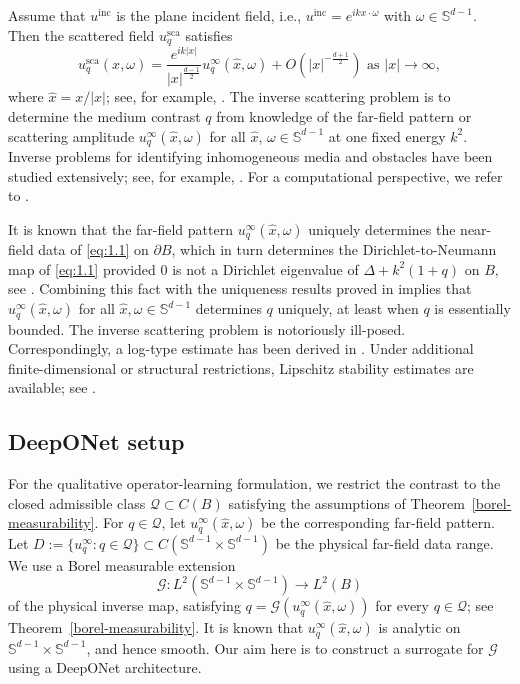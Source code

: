 \documentclass{article}
\numberwithin{equation}{section}
\theoremstyle{plain}
\begin{document}
	Assume that $u^{\mathrm{inc}}$ is the plane incident field, i.e., $u^{\mathrm{inc}}=e^{i k x \cdot \omega}$ with $\omega \in \mathbb{S}^{d-1}$. Then the scattered field $u_{q}^{\mathrm{sca}}$ satisfies 
	\begin{equation}\label{eq:uqsca}
		u_{q}^{\mathrm{sca}}(x, \omega)=\frac{e^{i k|x|}}{|x|^{\frac{d-1}{2}}} u_{q}^{\infty}(\hat{x}, \omega)+O\left(|x|^{-\frac{d+1}{2}}\right) \text{ as } |x| \to \infty,
	\end{equation}
	where $\hat{x}=x /|x|$; see, for example, \cite[p.~232]{Ser17}. The inverse scattering problem is to determine the medium contrast $q$ from knowledge of the far-field pattern or scattering amplitude $u_q^\infty(\hat{x},\omega)$ for all $\hat{x}$, $\omega \in \mathbb{S}^{d-1}$ at one fixed energy $k^{2}$. Inverse problems for identifying inhomogeneous media and obstacles have been studied extensively; see, for example, \cite{CK19, CC14, CCH22, KG07, NP15}. For a computational perspective, we refer to \cite{Che18}.
	
	It is known that the far-field pattern $u_{q}^{\infty}(\hat{x}, \omega)$ uniquely determines the near-field data of \eqref{eq:1.1} on $\partial B$, which in turn determines the Dirichlet-to-Neumann map of \eqref{eq:1.1} provided $0$ is not a Dirichlet eigenvalue of $\Delta+k^{2}(1+q)$ on $B$, see \cite{Nac88}. Combining this fact with the uniqueness results proved in \cite{SU87, Buk08} implies that $u_{q}^{\infty}(\hat{x}, \omega)$ for all $\hat{x}, \omega \in \mathbb{S}^{d-1}$ determines $q$ uniquely, at least when $q$ is essentially bounded. The inverse scattering problem is notoriously ill-posed. Correspondingly, a log-type estimate has been derived in \cite{HH01}. Under additional finite-dimensional or structural restrictions, Lipschitz stability estimates are available; see \cite{Bou13,AS22}.
	
	
	\subsection{DeepONet setup}
	
	For the qualitative operator-learning formulation, we restrict the contrast to the closed admissible class $\mathcal Q\subset C(B)$ satisfying the assumptions of Theorem~\ref{borel-measurability}. For $q\in\mathcal Q$, let $u_{q}^{\infty}(\hat{x},\omega)$ be the corresponding far-field pattern. Let $D:=\{u_q^\infty:q\in\mathcal Q\}\subset C(\mathbb S^{d-1}\times\mathbb S^{d-1})$ be the physical far-field data range. We use a Borel measurable extension
	\[
		\mathscr G:L^2(\mathbb S^{d-1}\times\mathbb S^{d-1})\to L^2(B)
	\]
	of the physical inverse map, satisfying
	$q=\mathscr{G}(u_{q}^{\infty}(\hat{x},\omega))$ for every $q\in\mathcal Q$; see Theorem~\ref{borel-measurability}.
	It is known that $u_{q}^{\infty}(\hat{x},\omega)$ is analytic on $\mathbb{S}^{d-1}\times\mathbb{S}^{d-1}$, and hence smooth. Our aim here is to construct a surrogate for $\mathscr{G}$ using a DeepONet architecture.
	
\end{document}
